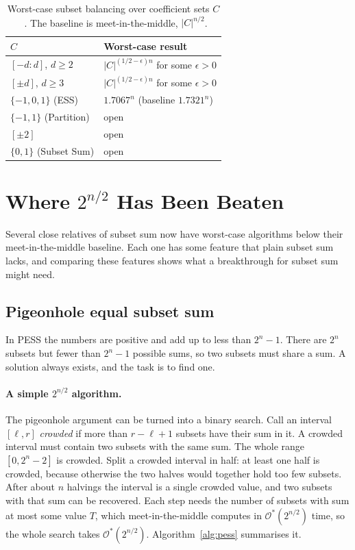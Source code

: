 \documentclass[11pt]{article}
\newcommand{\Oh}{\mathcal{O}}
\begin{document}
\begin{table}[t]
\centering
\caption{Worst-case subset balancing over coefficient sets $C$~\cite{rw}. The
baseline is meet-in-the-middle, $|C|^{n/2}$.}
\label{tab:rw}
\small
\begin{tabular}{ll}
\toprule
$C$ & Worst-case result \\
\midrule
$[-d:d]$, $d\ge2$ & $|C|^{(1/2-\epsilon)n}$ for some $\epsilon>0$ \\
$[\pm d]$, $d\ge3$ & $|C|^{(1/2-\epsilon)n}$ for some $\epsilon>0$ \\
$\{-1,0,1\}$ (ESS) & $1.7067^n$ (baseline $1.7321^n$) \\
$\{-1,1\}$ (Partition) & open \\
$[\pm2]$ & open \\
$\{0,1\}$ (Subset Sum) & open \\
\bottomrule
\end{tabular}
\end{table}

\section{Where $2^{n/2}$ Has Been Beaten}\label{sec:variants}
Several close relatives of subset sum now have worst-case algorithms below
their meet-in-the-middle baseline. Each one has some feature that plain subset
sum lacks, and comparing these features shows what a breakthrough for subset
sum might need.

\subsection{Pigeonhole equal subset sum}
In PESS the numbers are positive and add up to less than $2^n-1$. There are
$2^n$ subsets but fewer than $2^n-1$ possible sums, so two subsets must share a
sum. A solution always exists, and the task is to find one.

\paragraph{A simple $2^{n/2}$ algorithm.}
The pigeonhole argument can be turned into a binary search. Call an interval
$[\ell,r]$ \emph{crowded} if more than $r-\ell+1$ subsets have their sum in it.
A crowded interval must contain two subsets with the same sum. The whole range
$[0,2^n-2]$ is crowded. Split a crowded interval in half: at least one half is
crowded, because otherwise the two halves would together hold too few subsets.
After about $n$ halvings the interval is a single crowded value, and two
subsets with that sum can be recovered. Each step needs the number of subsets
with sum at most some value $T$, which meet-in-the-middle computes in
$\Oh^*(2^{n/2})$ time, so the whole search takes $\Oh^*(2^{n/2})$.
Algorithm~\ref{alg:pess} summarises it.
\end{document}
